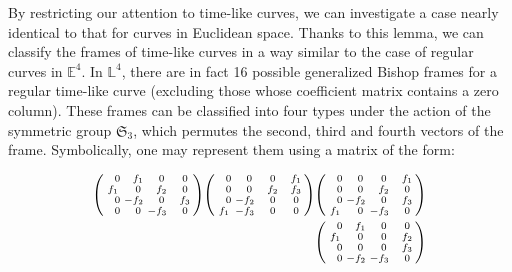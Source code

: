 \documentclass[a4paper]{amsart}
\theoremstyle{definition}
\theoremstyle{remark}
\newenvironment{psmatrix}{\left(\begin{smallmatrix}}{\end{smallmatrix}\right)}
\newcommand{\LL}{\mathbb{L}}
\numberwithin{equation}{section}
\begin{document}
By restricting our attention to time-like curves, we can investigate a case nearly identical to that for curves in Euclidean space. Thanks to this lemma, we can classify the frames of time-like curves in a way similar to the case of regular curves in $\mathbb{E}^4$. In $\LL^{4}$, there are in fact 16 possible generalized Bishop frames for a regular time-like curve (excluding those whose coefficient matrix contains a zero column). These frames can be classified into four types under the action of the symmetric group $\mathfrak{S}_{3}$, which permutes the second, third and fourth vectors of the frame. Symbolically, one may represent them using a matrix of the form:\\
\begin{minipage}[b]{0.48\columnwidth}
 \begin{align*}
\begin{psmatrix}
\phantom{-}0&\phantom{-}f_{1}&\phantom{-}0&\phantom{-}0\\
f_{1}&\phantom{-}0&\phantom{-}f_{2}&\phantom{-}0\\
\phantom{-}0&-f_{2}&\phantom{-}0&\phantom{-}f_{3}\\
\phantom{-}0&\phantom{-}0&-f_{3}&\phantom{-}0
\end{psmatrix}
\begin{psmatrix}
\phantom{-}0&\phantom{-}0&\phantom{-}0&\phantom{-}f_{1}\\
\phantom{-}0&\phantom{-}0&\phantom{-}f_{2}&\phantom{-}f_{3}\\
\phantom{-}0&-f_{2}&\phantom{-}0&\phantom{-}0\\
f_{1}&-f_{3}&\phantom{-}0&\phantom{-}0
\end{psmatrix}
\begin{psmatrix}
\phantom{-}0&\phantom{-}0&\phantom{-}0&\phantom{-}f_{1}\\
\phantom{-}0&\phantom{-}0&\phantom{-}f_{2}&\phantom{-}0\\
\phantom{-}0&-f_{2}&\phantom{-}0&\phantom{-}f_{3}\\
f_{1}&\phantom{-}0&-f_{3}&\phantom{-}0
\end{psmatrix}\\
\begin{psmatrix}
\phantom{-}0&\phantom{-}f_{1}&\phantom{-}0&\phantom{-}0\\
f_{1}&\phantom{-}0&\phantom{-}0&\phantom{-}f_{2}\\
\phantom{-}0&\phantom{-}0&\phantom{-}0&\phantom{-}f_{3}\\
\phantom{-}0&-f_{2}&-f_{3}&\phantom{-}0
\end{psmatrix}

\end{align*}
\end{minipage}
\end{document}
